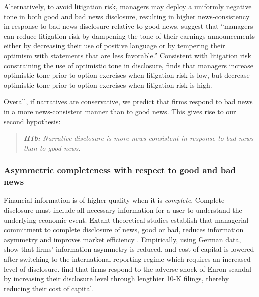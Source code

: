 \documentclass[letterpaper,12pt]{article}
\begin{document}
\begin{spacing}{1.5}
Alternatively, to avoid litigation risk, managers may deploy a uniformly negative tone in both good and bad news disclosure, resulting in higher news-consistency in response to bad news disclosure relative to good news.  suggest that ``managers can reduce litigation risk by dampening the tone of their earnings announcements either by decreasing their use of positive language or by tempering their optimism with statements that are less favorable.'' Consistent with litigation risk constraining the use of optimistic tone in disclosure,  finds that managers increase optimistic tone prior to option exercises when litigation risk is low, but decrease optimistic tone prior to option exercises when litigation risk is high. 

Overall, if narratives are conservative, we predict that firms respond to bad news in a more news-consistent manner than to good news. This gives rise to our second hypothesis:

\begin{quote}\label{hyp:h1b}
	\textit{\textbf{H1b:} Narrative disclosure is more news-consistent in response to bad news than to good news.}
\end{quote}

\subsubsection{Asymmetric completeness with respect to good and bad news}

\noindent Financial information is of higher quality when it is \textit{complete}. Complete disclosure must include all necessary information for a user to understand the underlying economic event. Extant theoretical studies establish that managerial commitment to complete disclosure of news, good or bad, reduces information asymmetry and improves market efficiency \cite{glostenBidAskTransaction1985, diamondOptimalReleaseInformation1985, diamondDisclosureLiquidityCost1991, baimanRelationCapitalMarkets1996}. Empirically, using German data,  show that firms' information asymmetry is reduced, and cost of capital is lowered after switching to the international reporting regime which requires an increased level of disclosure.  find that firms respond to the adverse shock of Enron scandal by increasing their disclosure level through lengthier 10-K filings, thereby reducing their cost of capital. 


\end{spacing}
\end{document}
